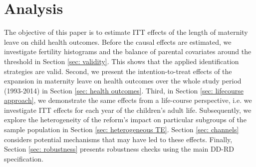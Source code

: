 \documentclass[a4paper ]{article}
\newlength\FHoffset
\newlength\FHleft
\newlength\FHright
\begin{document}
%
%




%	
	
	


\begin{landscape}
\begin{adjustwidth}{5cm}{}

\end{adjustwidth}
 \end{landscape}


\restoregeometry

\clearpage

\newpage
\section{Analysis}
\label{sec: Results}

The objective of this paper is to estimate ITT effects of the length of maternity leave on child health outcomes. Before the causal effects are estimated, we investigate fertility histograms and the balance of parental covariates around the threshold in Section \ref{sec: validity}. This shows that the applied identification strategies are valid. Second, we present the intention-to-treat effects of the expansion in maternity leave on health outcomes over the whole study period (1993-2014) in Section \ref{sec: health outcomes}. Third, in Section \ref{sec: lifecourse approach}, we demonstrate the same effects from a life-course perspective, i.e. we investigate ITT effects for each year of the children's adult life. Subsequently, we explore the heterogeneity of the reform's impact on particular subgroups of the sample population in Section \ref{sec: heterogeneous TE}. Section \ref{sec: channels} considers potential mechanisms that may have led to these effects. Finally, Section \ref{sec: robustness} presents robustness checks using the main DD-RD specification. 

 
\bigskip           
\end{document}

